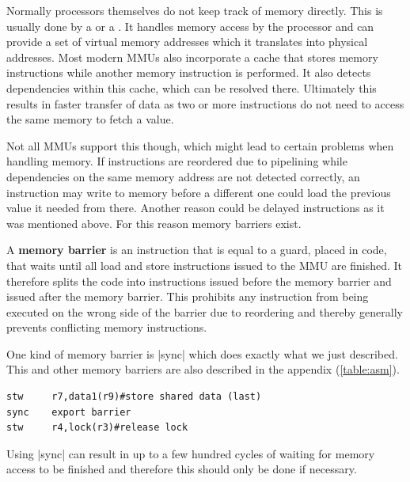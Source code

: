 Normally processors themselves do not keep track of memory directly.
This is usually done by a  or a .
It handles memory access by the processor and can provide a set of virtual memory addresses which it translates into physical addresses.
Most modern \ac{MMU}s also incorporate a cache that stores memory instructions while another memory instruction is performed.
It also detects dependencies within this cache, which can be resolved there.
Ultimately this results in faster transfer of data as two or more instructions do not need to access the same memory to fetch a value.

Not all \ac{MMU}s support this though, which might lead to certain problems when handling memory.
If instructions are reordered due to pipelining while dependencies on the same memory address are not detected correctly, an instruction may write to memory before a different one could load the previous value it needed from there.
Another reason could be delayed instructions as it was mentioned above.
For this reason memory barriers exist.

A \textbf{memory barrier} is an instruction that is equal to a guard, placed in code, that waits until all load and store instructions issued to the \ac{MMU} are finished.
It therefore splits the code into instructions issued before the memory barrier and issued after the memory barrier.
This prohibits any instruction from being executed on the wrong side of the barrier due to reordering and thereby generally prevents conflicting memory instructions.

One kind of memory barrier is |sync| which does exactly what we just described.
This and other memory barriers are also described in the appendix (\ref{table:asm}).

\begin{lstlisting}[caption=The memory barrier ensures that the first store was performed before the second store is issued., label=lst:sync]
stw     r7,data1(r9)#store shared data (last)
sync    export barrier
stw     r4,lock(r3)#release lock
\end{lstlisting}

Using |sync| can result in up to a few hundred cycles of waiting for memory access to be finished and therefore this should only be done if necessary.

